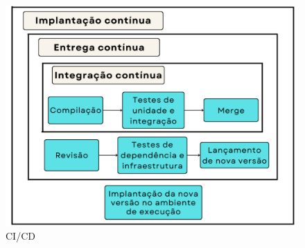\begin{figure}[htb]
	\caption{\label{figura-ci-cd}CI/CD}
	\begin{center}
	    \includegraphics[scale=0.5]{Imagens/ci-cd.pdf}
	\end{center}
\end{figure}




